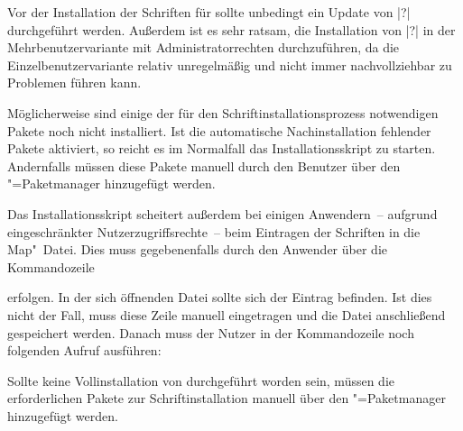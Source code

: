 Vor der Installation der Schriften für \TUDScript sollte unbedingt ein Update 
von |?| durchgeführt werden. Außerdem ist es sehr 
ratsam, die Installation von |?| in der 
Mehrbenutzervariante mit Administratorrechten durchzuführen, da die 
Einzelbenutzervariante relativ unregelmäßig und nicht immer nachvollziehbar zu 
Problemen führen kann. 

Möglicherweise sind einige der für den Schriftinstallationsprozess notwendigen 
Pakete noch nicht installiert. Ist die automatische Nachinstallation fehlender 
Pakete aktiviert, so reicht es im Normalfall das Installationsskript zu 
starten. Andernfalls müssen diese Pakete manuell durch den Benutzer über den 
"=Paketmanager hinzugefügt werden.

Das Installationsskript scheitert außerdem bei einigen Anwendern~-- aufgrund 
eingeschränkter Nutzerzugriffsrechte~-- beim Eintragen der Schriften in die 
Map"~Datei. Dies muss gegebenenfalls durch den Anwender über die Kommandozeile 
%
\begin{quoting}
\end{quoting}
%
erfolgen. In der sich öffnenden Datei sollte sich der Eintrag 
 befinden. Ist dies nicht der Fall, muss diese Zeile 
manuell eingetragen und die Datei anschließend gespeichert werden. Danach muss 
der Nutzer in der Kommandozeile noch folgenden Aufruf ausführen:
%
\begin{quoting}
\end{quoting}


Sollte keine Vollinstallation von  durchgeführt 
worden sein, müssen die erforderlichen Pakete zur Schriftinstallation manuell 
über den "=Paketmanager hinzugefügt werden.


